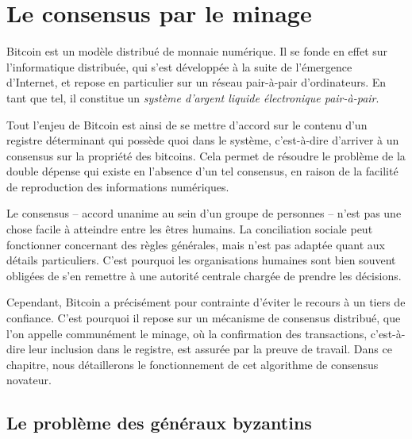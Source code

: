 
\chapter{Le consensus par le minage}
\label{ch:confirmation}

Bitcoin est un modèle distribué de monnaie numérique. Il se fonde en effet sur l'informatique distribuée, qui s'est développée à la suite de l'émergence d'Internet, et repose en particulier sur un réseau pair-à-pair d'ordinateurs. En tant que tel, il constitue un \emph{système d'argent liquide électronique pair-à-pair}.

Tout l'enjeu de Bitcoin est ainsi de se mettre d'accord sur le contenu d'un registre déterminant qui possède quoi dans le système, c'est-à-dire d'arriver à un consensus sur la propriété des bitcoins. Cela permet de résoudre le problème de la double dépense qui existe en l'absence d'un tel consensus, en raison de la facilité de reproduction des informations numériques.

Le consensus -- accord unanime au sein d'un groupe de personnes -- n'est pas une chose facile à atteindre entre les êtres humains. La conciliation sociale peut fonctionner concernant des règles générales, mais n'est pas adaptée quant aux détails particuliers. C'est pourquoi les organisations humaines sont bien souvent obligées de s'en remettre à une autorité centrale chargée de prendre les décisions.

Cependant, Bitcoin a précisément pour contrainte d'éviter le recours à un tiers de confiance. C'est pourquoi il repose sur un mécanisme de consensus distribué, que l'on appelle communément le minage, où la confirmation des transactions, c'est-à-dire leur inclusion dans le registre, est assurée par la preuve de travail. Dans ce chapitre, nous détaillerons le fonctionnement de cet algorithme de consensus novateur.


\section*{Le problème des généraux byzantins} %

